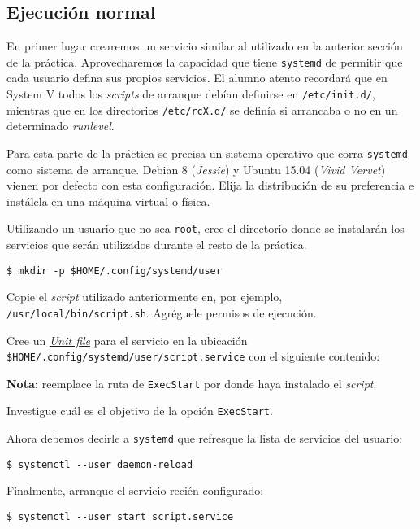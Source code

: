 \subsection{Ejecución normal}
En primer lugar crearemos un servicio similar al utilizado en la anterior
sección de la práctica. Aprovecharemos la capacidad que tiene
\texttt{systemd} de permitir que cada usuario defina sus propios
servicios. El alumno atento recordará que en System V todos los
\textit{scripts} de arranque debían definirse en \texttt{/etc/init.d/},
mientras que en los directorios \texttt{/etc/rcX.d/} se definía si
arrancaba o no en un determinado \textit{runlevel}.
\begin{questions}
  \question Para esta parte de la práctica se precisa un sistema operativo
  que corra \texttt{systemd} como sistema de arranque. Debian 8
  (\textit{Jessie}) y Ubuntu 15.04 (\textit{Vivid Vervet}) vienen por
  defecto con esta configuración. Elija la distribución de su preferencia e
  instálela en una máquina virtual o física.

  \question Utilizando un usuario que no sea \texttt{root}, cree el
  directorio donde se instalarán los servicios que serán utilizados durante
  el resto de la práctica.
\begin{verbatim}
$ mkdir -p $HOME/.config/systemd/user
\end{verbatim}

  \question Copie el \textit{script} utilizado anteriormente en, por
  ejemplo, \texttt{/usr/local/bin/script.sh}. Agréguele permisos de
  ejecución.

  \question Cree un
  \textit{\href{http://0pointer.de/public/systemd-man/systemd.unit.html}{Unit
      file}} para el servicio en la ubicación
  \texttt{\$HOME/.config/systemd/user/script.service} con el siguiente
  contenido: 

  { \small \textbf{Nota:} reemplace la ruta de \texttt{ExecStart} por donde haya
    instalado el \textit{script}. }

  \question Investigue cuál es el objetivo de la opción \texttt{ExecStart}.
  
  \question Ahora debemos decirle a \texttt{systemd} que refresque la lista
  de servicios del usuario:
\begin{verbatim}
$ systemctl --user daemon-reload
\end{verbatim}

  \question Finalmente, arranque el servicio recién configurado:
\begin{verbatim}
$ systemctl --user start script.service
\end{verbatim}


\end{questions}

